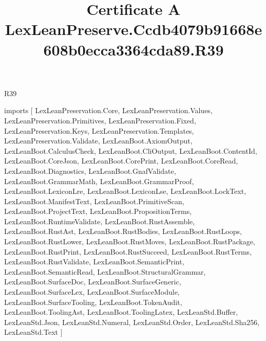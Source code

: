 \begin{lexlean}{R39}
\title{Certificate A LexLeanPreserve.Ccdb4079b91668e608b0ecca3364cda89.R39}
\begin{coremodule}
imports [
  LexLeanPreservation.Core,
  LexLeanPreservation.Values,
  LexLeanPreservation.Primitives,
  LexLeanPreservation.Fixed,
  LexLeanPreservation.Keys,
  LexLeanPreservation.Templates,
  LexLeanPreservation.Validate,
  LexLeanBoot.AxiomOutput,
  LexLeanBoot.CalculusCheck,
  LexLeanBoot.CliOutput,
  LexLeanBoot.ContentId,
  LexLeanBoot.CoreJson,
  LexLeanBoot.CorePrint,
  LexLeanBoot.CoreRead,
  LexLeanBoot.Diagnostics,
  LexLeanBoot.GnafValidate,
  LexLeanBoot.GrammarMath,
  LexLeanBoot.GrammarProof,
  LexLeanBoot.LexiconLre,
  LexLeanBoot.LexiconLse,
  LexLeanBoot.LockText,
  LexLeanBoot.ManifestText,
  LexLeanBoot.PrimitiveScan,
  LexLeanBoot.ProjectText,
  LexLeanBoot.PropositionTerms,
  LexLeanBoot.RuntimeValidate,
  LexLeanBoot.RustAssemble,
  LexLeanBoot.RustAst,
  LexLeanBoot.RustBodies,
  LexLeanBoot.RustLoops,
  LexLeanBoot.RustLower,
  LexLeanBoot.RustMoves,
  LexLeanBoot.RustPackage,
  LexLeanBoot.RustPrint,
  LexLeanBoot.RustSucceed,
  LexLeanBoot.RustTerms,
  LexLeanBoot.RustValidate,
  LexLeanBoot.SemanticPrint,
  LexLeanBoot.SemanticRead,
  LexLeanBoot.StructuralGrammar,
  LexLeanBoot.SurfaceDoc,
  LexLeanBoot.SurfaceGeneric,
  LexLeanBoot.SurfaceLex,
  LexLeanBoot.SurfaceModule,
  LexLeanBoot.SurfaceTooling,
  LexLeanBoot.TokenAudit,
  LexLeanBoot.ToolingAst,
  LexLeanBoot.ToolingLatex,
  LexLeanStd.Buffer,
  LexLeanStd.Json,
  LexLeanStd.Numeral,
  LexLeanStd.Order,
  LexLeanStd.Sha256,
  LexLeanStd.Text
]


\end{coremodule}
\end{lexlean}

